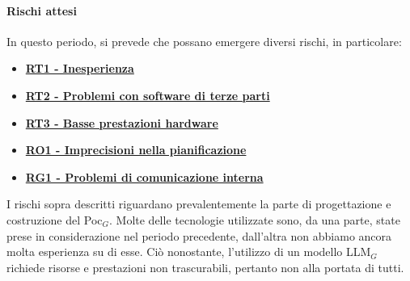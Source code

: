 \paragraph{Rischi attesi}  
In questo periodo, si prevede che possano emergere diversi rischi, in particolare:

\begin{itemize}
    \item \textbf{\hyperlink{RT1}{RT1 - Inesperienza}}
    \item \textbf{\hyperlink{RT2}{RT2 - Problemi con software di terze parti}}
    \item \textbf{\hyperlink{RT3}{RT3 - Basse prestazioni hardware}}
    \item \textbf{\hyperlink{RO1}{RO1 - Imprecisioni nella pianificazione}}
    \item \textbf{\hyperlink{RG1}{RG1 - Problemi di comunicazione interna}}
\end{itemize}

I rischi sopra descritti riguardano prevalentemente la parte di progettazione e costruzione del Poc$_G$. Molte delle tecnologie utilizzate sono, da una parte, state prese in considerazione nel periodo precedente, dall'altra non abbiamo ancora molta esperienza su di esse. Ciò nonostante, l'utilizzo di un modello LLM$_G$ richiede risorse e prestazioni non trascurabili, pertanto non alla portata di tutti.

